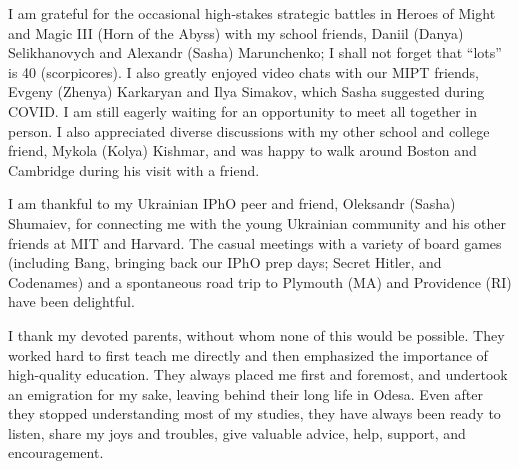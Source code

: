 I am grateful for the occasional high-stakes strategic battles in Heroes of Might and Magic III (Horn of the Abyss) with my school friends, Daniil (Danya) Selikhanovych and Alexandr (Sasha) Marunchenko; I shall not forget that ``lots'' is 40 (scorpicores).
I also greatly enjoyed video chats with our MIPT friends, Evgeny (Zhenya) Karkaryan and Ilya Simakov, which Sasha suggested during COVID.
I am still eagerly waiting for an opportunity to meet all together in person.
I also appreciated diverse discussions with my other school and college friend, Mykola (Kolya) Kishmar, and was happy to walk around Boston and Cambridge during his visit with a friend.

I am thankful to my Ukrainian IPhO peer and friend, Oleksandr (Sasha) Shumaiev, for connecting me with the young Ukrainian community and his other friends at MIT and Harvard.
The casual meetings with a variety of board games (including Bang, bringing back our IPhO prep days; Secret Hitler, and Codenames) and a spontaneous road trip to Plymouth (MA) and Providence (RI) have been delightful.

I thank my devoted parents, without whom none of this would be possible.
They worked hard to first teach me directly and then emphasized the importance of high-quality education.
They always placed me first and foremost, and undertook an emigration for my sake, leaving behind their long life in Odesa.
Even after they stopped understanding most of my studies, they have always been ready to listen, share my joys and troubles, give valuable advice, help, support, and encouragement.